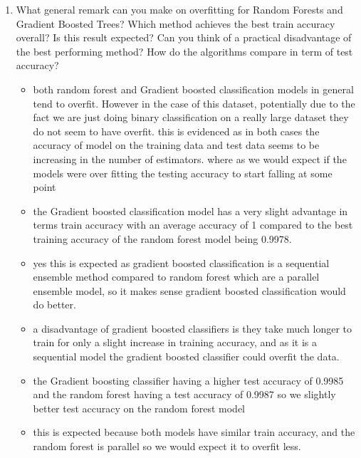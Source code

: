 \documentclass{article}
\theoremstyle{plain}
\theoremstyle{definition}
\begin{document}
\begin{enumerate}
\item What general remark can you make on overfitting for Random Forests and Gradient Boosted Trees? Which method achieves the best train accuracy overall? Is this result expected? 
Can you think of a practical disadvantage of the best performing method? How do the algorithms compare in term of test accuracy? \\



\begin{itemize}
    \color{blue}
    \item both random forest and Gradient boosted classification models in general tend to overfit. However in the case of this dataset, potentially due to the fact we are just doing binary classification on a really large dataset they do not seem to have overfit. this is evidenced as in both cases the accuracy of model on the training data and test data seems to be increasing in the number of estimators. where as we would expect if the models were over fitting the testing accuracy to start falling at some point 
    \item the Gradient boosted classification model has a very slight  advantage in terms train accuracy with an average accuracy of 1 compared to the best training accuracy of the random forest model being 0.9978.
    \item yes this is expected as gradient boosted classification is a sequential ensemble method compared to random forest which are a parallel ensemble model, so it makes sense gradient boosted classification would do better. 
    \item a disadvantage of gradient boosted classifiers is they take much longer to train for only a slight increase in training accuracy, and as it is a sequential model the gradient boosted classifier could overfit the data.  
    \item the Gradient boosting classifier having a higher test accuracy of 0.9985 and the random forest having a test accuracy of 0.9987 so we slightly better test accuracy on the random forest model
    \item this is expected because both models have similar train accuracy, and the random forest is parallel so we would expect it to overfit less. 
\end{itemize}

\setcounter{saveenum}{\value{enumi}}
\end{enumerate}
\end{document}
